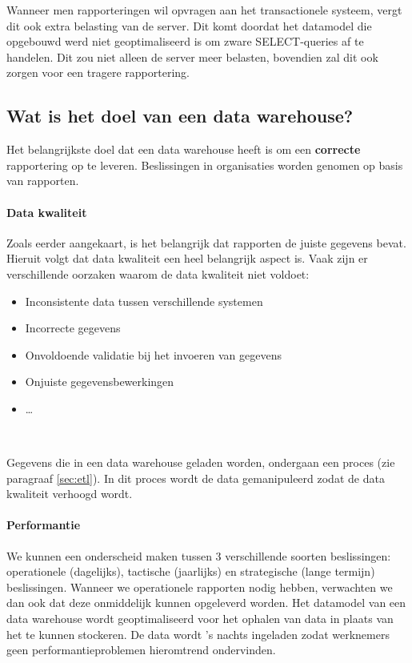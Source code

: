 Wanneer men rapporteringen wil opvragen aan het transactionele systeem, vergt dit ook extra belasting van de server. Dit komt doordat het datamodel die opgebouwd werd niet geoptimaliseerd is om zware SELECT-queries af te handelen. Dit zou niet alleen de server meer belasten, bovendien zal dit ook zorgen voor een tragere rapportering. 


\subsection{Wat is het doel van een data warehouse?}
Het belangrijkste doel dat een data warehouse heeft is om een \textbf{correcte} rapportering op te leveren. Beslissingen in organisaties worden genomen op basis van rapporten.

\paragraph{Data kwaliteit}
Zoals eerder aangekaart, is het belangrijk dat rapporten de juiste gegevens bevat. Hieruit volgt dat data kwaliteit een heel belangrijk aspect is. Vaak zijn er verschillende oorzaken waarom de data kwaliteit niet voldoet:

\begin{itemize}
	\item Inconsistente data tussen verschillende systemen
	\item Incorrecte gegevens
	\item Onvoldoende validatie bij het invoeren van gegevens
	\item Onjuiste gegevensbewerkingen
	\item \ldots
\end{itemize}  
~\autocite{Helfert2002}

Gegevens die in een data warehouse geladen worden, ondergaan een proces (zie paragraaf \ref{sec:etl}). In dit proces wordt de data gemanipuleerd zodat de data kwaliteit verhoogd wordt.

\paragraph{Performantie}
We kunnen een onderscheid maken tussen 3 verschillende soorten beslissingen: operationele (dagelijks), tactische (jaarlijks) en strategische (lange termijn) beslissingen. Wanneer we operationele rapporten nodig hebben, verwachten we dan ook dat deze onmiddelijk kunnen opgeleverd worden. Het datamodel van een data warehouse wordt geoptimaliseerd voor het ophalen van data in plaats van het te kunnen stockeren. De data wordt 's nachts ingeladen zodat werknemers geen performantieproblemen hieromtrend ondervinden. 

